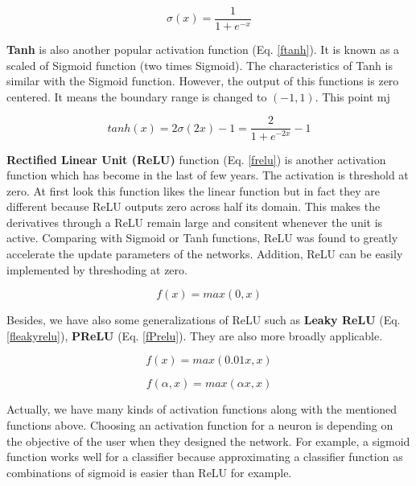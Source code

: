 \begin{equation}
	\sigma(x) = \frac{1}{1+e^{-x}}
	\label{fsigmoid}
\end{equation}

\textbf{Tanh} is also another popular activation function (Eq. \ref{ftanh}). It is known as a scaled of Sigmoid function (two times Sigmoid). The characteristics of Tanh is similar with the Sigmoid function. However, the output of this functions is zero centered. It means the boundary range is changed to $(-1, 1)$. This point mj 

\begin{equation}
	tanh(x) = 2\sigma(2x) - 1 = \frac{2}{1 + e^{-2x}} - 1
	\label{ftanh}
\end{equation}

\textbf{Rectified Linear Unit (ReLU)} function (Eq. \ref{frelu}) is another activation function which has become in the last of few years. The activation is threshold at zero. At first look this function likes the linear function but in fact they are different because ReLU outputs zero across half its domain. This makes the derivatives through a ReLU remain large and consitent whenever the unit is active. Comparing with Sigmoid or Tanh functions, ReLU was found to greatly accelerate the update parameters of the networks. Addition, ReLU can be easily implemented by threshoding at zero.

\begin{equation}
	f(x) = max(0,x)
	\label{frelu}
\end{equation}

Besides, we have also some generalizations of ReLU such as \textbf{Leaky ReLU} (Eq. \ref{fleakyrelu}), \textbf{PReLU} (Eq. \ref{fPrelu}). They are also more broadly applicable.

\begin{equation}
	f(x) = max(0.01x, x)
	\label{fleakyrelu}
\end{equation}

\begin{equation}
	f(\alpha,x) = max(\alpha x, x)
	\label{fPrelu}
\end{equation}

Actually, we have many kinds of activation functions along with the mentioned functions above. Choosing an activation function for a neuron is depending on the objective of the user when they designed the network. For example, a sigmoid function works well for a classifier because approximating a classifier function as combinations of sigmoid is easier than ReLU for example.

